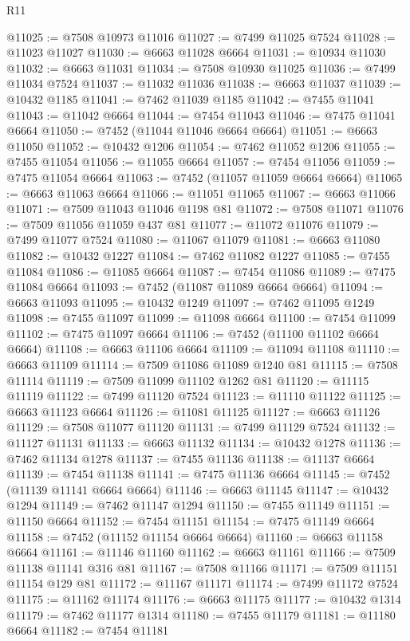 \begin{lexlean}{R11}
\begin{coremodule}
{{{{{{{{{{{{{{{{{{{{{{{{{{{{{{{{{{{{{{{{{{{{{{{{{{{{{{{{{{{{{{{{{{{{{{{{{{{{{{{{{{@11025 := @7508 @10973 @11016
@11027 := @7499 @11025 @7524
@11028 := @11023 @11027
@11030 := @6663 @11028 @6664
@11031 := @10934 @11030
@11032 := @6663 @11031
@11034 := @7508 @10930 @11025
@11036 := @7499 @11034 @7524
@11037 := @11032 @11036
@11038 := @6663 @11037
@11039 := @10432 @1185
@11041 := @7462 @11039 @1185
@11042 := @7455 @11041
@11043 := @11042 @6664
@11044 := @7454 @11043
@11046 := @7475 @11041 @6664
@11050 := @7452 (@11044 @11046 @6664 @6664)
@11051 := @6663 @11050
@11052 := @10432 @1206
@11054 := @7462 @11052 @1206
@11055 := @7455 @11054
@11056 := @11055 @6664
@11057 := @7454 @11056
@11059 := @7475 @11054 @6664
@11063 := @7452 (@11057 @11059 @6664 @6664)
@11065 := @6663 @11063 @6664
@11066 := @11051 @11065
@11067 := @6663 @11066
@11071 := @7509 @11043 @11046 @1198 @81
@11072 := @7508 @11071
@11076 := @7509 @11056 @11059 @437 @81
@11077 := @11072 @11076
@11079 := @7499 @11077 @7524
@11080 := @11067 @11079
@11081 := @6663 @11080
@11082 := @10432 @1227
@11084 := @7462 @11082 @1227
@11085 := @7455 @11084
@11086 := @11085 @6664
@11087 := @7454 @11086
@11089 := @7475 @11084 @6664
@11093 := @7452 (@11087 @11089 @6664 @6664)
@11094 := @6663 @11093
@11095 := @10432 @1249
@11097 := @7462 @11095 @1249
@11098 := @7455 @11097
@11099 := @11098 @6664
@11100 := @7454 @11099
@11102 := @7475 @11097 @6664
@11106 := @7452 (@11100 @11102 @6664 @6664)
@11108 := @6663 @11106 @6664
@11109 := @11094 @11108
@11110 := @6663 @11109
@11114 := @7509 @11086 @11089 @1240 @81
@11115 := @7508 @11114
@11119 := @7509 @11099 @11102 @1262 @81
@11120 := @11115 @11119
@11122 := @7499 @11120 @7524
@11123 := @11110 @11122
@11125 := @6663 @11123 @6664
@11126 := @11081 @11125
@11127 := @6663 @11126
@11129 := @7508 @11077 @11120
@11131 := @7499 @11129 @7524
@11132 := @11127 @11131
@11133 := @6663 @11132
@11134 := @10432 @1278
@11136 := @7462 @11134 @1278
@11137 := @7455 @11136
@11138 := @11137 @6664
@11139 := @7454 @11138
@11141 := @7475 @11136 @6664
@11145 := @7452 (@11139 @11141 @6664 @6664)
@11146 := @6663 @11145
@11147 := @10432 @1294
@11149 := @7462 @11147 @1294
@11150 := @7455 @11149
@11151 := @11150 @6664
@11152 := @7454 @11151
@11154 := @7475 @11149 @6664
@11158 := @7452 (@11152 @11154 @6664 @6664)
@11160 := @6663 @11158 @6664
@11161 := @11146 @11160
@11162 := @6663 @11161
@11166 := @7509 @11138 @11141 @316 @81
@11167 := @7508 @11166
@11171 := @7509 @11151 @11154 @129 @81
@11172 := @11167 @11171
@11174 := @7499 @11172 @7524
@11175 := @11162 @11174
@11176 := @6663 @11175
@11177 := @10432 @1314
@11179 := @7462 @11177 @1314
@11180 := @7455 @11179
@11181 := @11180 @6664
@11182 := @7454 @11181
}}}}}}}}}}}}}}}}}}}}}}}}}}}}}}}}}}}}}}}}}}}}}}}}}}}}}}}}}}}}}}}}}}}}}}}}}}}}}}}}}}
\end{coremodule}
\end{lexlean}
